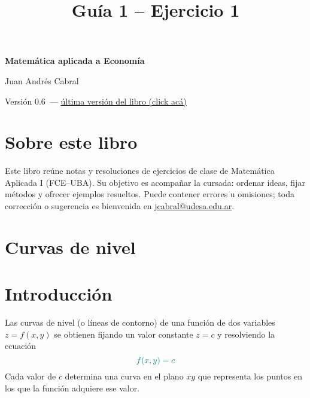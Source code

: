\documentclass{article}
\newcommand{\version}{0.6}
\begin{document}
\begin{titlepage}
    \centering
    \vspace*{2cm}
    {\Huge\bfseries\color{teal} Matemática aplicada a Economía\par}
    \vspace{0.5cm}
    {\Large\bfseries \par}
    \vspace{2cm}
    {\large Juan Andrés Cabral\par}
    \vfill
{\normalsize Versión \version\ — \href{https://cabraljuan.github.io/matematica%20aplicada/matematica%20aplicada%201.pdf}{última versión del libro (click acá)}\par}
    \thispagestyle{empty}
\end{titlepage}

\section*{Sobre este libro}

Este libro reúne notas y resoluciones de ejercicios de clase de Matemática Aplicada I (FCE–UBA). Su objetivo es acompañar la cursada: ordenar ideas, fijar métodos y ofrecer ejemplos resueltos. Puede contener errores u omisiones; toda corrección o sugerencia es bienvenida en \url{jcabral@udesa.edu.ar}.
\newpage


\renewcommand{\contentsname}{Índice}
\tableofcontents
\newpage

\title{Guía 1 – Ejercicio 1}
\author{}
\date{}





\section{Curvas de nivel}

\section*{Introducción}
Las curvas de nivel (o líneas de contorno) de una función de dos variables \(z=f(x,y)\) se obtienen fijando un valor constante \(z=c\) y resolviendo la ecuación
\[
\color{teal} f(x,y)=c
\]
Cada valor de \(c\) determina una curva en el plano \(xy\) que representa los puntos en los que la función adquiere ese valor.
\end{document}
